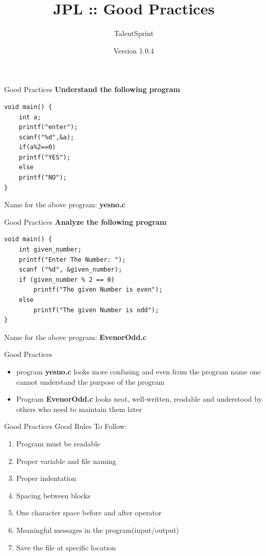 \documentclass[14pt]{beamer}
\title[COJ:Java:02]{JPL :: Good Practices}
\author[TS]{TalentSprint}
\institute[L\&D]{Licensed To Skill}
\date{Version 1.0.4}
\begin{document}
\begin{frame}
  \titlepage
\end{frame}



\begin{frame}[fragile]{Good Practices}
 \textbf{Understand the following program}
 \begin{lstlisting}[numbers=none]
void main() {
    int a;
    printf("enter");
    scanf("%d",&a);
    if(a%2==0)
    printf("YES");
    else
    printf("NO");
}
 \end{lstlisting}
Name for the above program: \textbf{yesno.c}
\end{frame}


\begin{frame}[fragile]{Good Practices}
\textbf{Analyze the following program}
 \begin{lstlisting}[numbers=none]
void main() {
    int given_number;
    printf("Enter The Number: ");
    scanf ("%d", &given_number);
    if (given_number % 2 == 0)
        printf("The given Number is even");
    else 
        printf("The given Number is odd");	
}
 \end{lstlisting}
Name for the above program: \textbf{EvenorOdd.c}
\end{frame}

\begin{frame}[fragile]{Good Practices}

\begin{itemize}
 \item program \textbf{yesno.c} looks more confusing and even from the program name one cannot understand the purpose of the program
 \item Program \textbf{EvenorOdd.c} looks neat, well-written, readable and understood by others who need to maintain them later
\end{itemize}
\end{frame}

\begin{frame}[fragile]{Good Practices}
 Good Rules To Follow:
 \begin{enumerate}[Rule 1]
  \item Program must be readable 
  \item Proper variable and  file naming
  \item Proper indentation
  \item Spacing between blocks
  \item One character space before and after operator
  \item Meaningful messages in the program(input/output)
  \item Save the file at specific location 
 \end{enumerate}
\end{frame}
\end{document}
